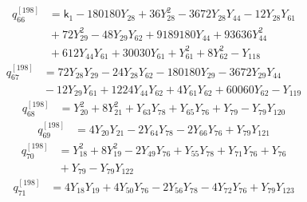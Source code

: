\begin{equation}\label{q198:row:066}
\begin{aligned}
q_{66}^{[198]} &={} \mathsf{k}_{1} - 180180Y_{28} + 36Y_{28}^{2} - 3672Y_{28}Y_{44} - 12Y_{28}Y_{61}\\
&{} + 72Y_{29}^{2} - 48Y_{29}Y_{62} + 9189180Y_{44} + 93636Y_{44}^{2}\\
&{} + 612Y_{44}Y_{61} + 30030Y_{61} + Y_{61}^{2} + 8Y_{62}^{2} - Y_{118}
\end{aligned}
\end{equation}
\begin{equation}\label{q198:row:067}
\begin{aligned}
q_{67}^{[198]} &={} 72Y_{28}Y_{29} - 24Y_{28}Y_{62} - 180180Y_{29} - 3672Y_{29}Y_{44}\\
&{} - 12Y_{29}Y_{61} + 1224Y_{44}Y_{62} + 4Y_{61}Y_{62} + 60060Y_{62} - Y_{119}
\end{aligned}
\end{equation}
\begin{equation}\label{q198:row:068}
\begin{aligned}
q_{68}^{[198]} &={} Y_{20}^{2} + 8Y_{21}^{2} + Y_{63}Y_{78} + Y_{65}Y_{76} + Y_{79} - Y_{79}Y_{120}
\end{aligned}
\end{equation}
\begin{equation}\label{q198:row:069}
\begin{aligned}
q_{69}^{[198]} &={} 4Y_{20}Y_{21} - 2Y_{64}Y_{78} - 2Y_{66}Y_{76} + Y_{79}Y_{121}
\end{aligned}
\end{equation}
\begin{equation}\label{q198:row:070}
\begin{aligned}
q_{70}^{[198]} &={} Y_{18}^{2} + 8Y_{19}^{2} - 2Y_{49}Y_{76} + Y_{55}Y_{78} + Y_{71}Y_{76} + Y_{76}\\
&{} + Y_{79} - Y_{79}Y_{122}
\end{aligned}
\end{equation}
\begin{equation}\label{q198:row:071}
\begin{aligned}
q_{71}^{[198]} &={} 4Y_{18}Y_{19} + 4Y_{50}Y_{76} - 2Y_{56}Y_{78} - 4Y_{72}Y_{76} + Y_{79}Y_{123}
\end{aligned}
\end{equation}
